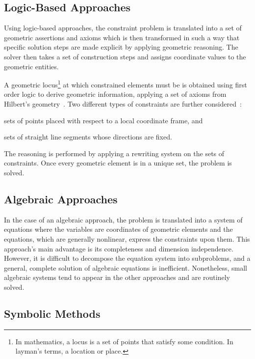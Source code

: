 \subsection{Logic-Based Approaches}%
\label{sec:intro.constraints.logic}

Using logic-based approaches, the constraint problem is translated into a set of
geometric assertions and axioms which is then transformed in such a way that
specific solution steps are made explicit by applying geometric reasoning.  The
solver then takes a set of construction steps and assigns coordinate values to
the geometric entities.

A geometric locus\footnote{In mathematics, a locus is a set of points that
satisfy some condition.  In layman's terms, a location or place.} at which
constrained elements must be is obtained using first order logic to derive
geometric information, applying a set of axioms from Hilbert's
geometry~\cite{Aldefeld:1988:VGBGRM,Bruderlin:1993:USGRRSGSS,Sohrt:1991:IC3DM}.
Two different types of constraints are further
considered~\cite{Sunde:1987:CADSDSS,Verroust:1992:RMPCAD}:
\begin{enumerate*}[label= (\arabic*)]
  \item sets of points placed with respect to a local coordinate frame, and
  \item sets of straight line segments whose directions are fixed.
\end{enumerate*}
The reasoning is performed by applying a rewriting system on the sets of
constraints.  Once every geometric element is in a unique set, the problem is
solved.

\subsection{Algebraic Approaches}%
\label{sec:intro.constraints.algebraic}

In the case of an algebraic approach, the problem is translated into a system of
equations where the variables are coordinates of geometric elements and the
equations, which are generally nonlinear, express the constraints upon them.
This approach's main advantage is its completeness and dimension independence.
However, it is difficult to decompose the equation system into subproblems, and
a general, complete solution of algebraic equations is inefficient.
Nonetheless, small algebraic systems tend to appear in the other approaches and
are routinely solved.

\subsection{Symbolic Methods}%
\label{sec:intro.constraints.symbolic}

